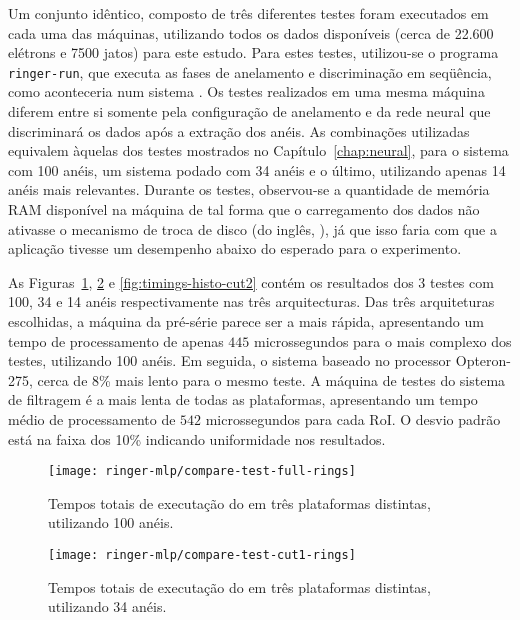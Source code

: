 Um conjunto idêntico, composto de três diferentes testes foram executados em
cada uma das máquinas, utilizando todos os dados disponíveis (cerca de 22.600
elétrons e 7500 jatos) para este estudo. Para estes testes, utilizou-se o
programa \texttt{ringer-run}, que executa as fases de anelamento e
discriminação em seqüência, como aconteceria num sistema .  Os
testes realizados em uma mesma máquina diferem entre si somente pela
configuração de anelamento e da rede neural que discriminará os dados após a
extração dos anéis. As combinações utilizadas equivalem àquelas dos testes
mostrados no Capítulo~\ref{chap:neural}, para o sistema com 100 anéis, um
sistema podado com 34 anéis e o último, utilizando apenas 14 anéis mais
relevantes. Durante os testes, observou-se a quantidade de memória RAM
disponível na máquina de tal forma que o carregamento dos dados não ativasse o
mecanismo de troca de disco (do inglês, ), já que isso faria com que
a aplicação tivesse um desempenho abaixo do esperado para o experimento.

As Figuras~\ref{fig:timings-histo-full}, \ref{fig:timings-histo-cut1} e
\ref{fig:timings-histo-cut2} contém os resultados dos 3 testes com 100, 34 e
14 anéis respectivamente nas três arquitecturas. Das três arquiteturas
escolhidas, a máquina da pré-série parece ser a mais rápida, apresentando um
tempo de processamento de apenas $445$ microssegundos para o mais complexo dos
testes, utilizando 100 anéis. Em seguida, o sistema baseado no processor
Opteron-275, cerca de 8\% mais lento para o mesmo teste. A máquina de testes
do sistema de filtragem é a mais lenta de todas as plataformas, apresentando
um tempo médio de processamento de $542$ microssegundos para cada RoI. O
desvio padrão está na faixa dos 10\% indicando uniformidade nos resultados.

\begin{figure}
\begin{center}
\texttt{[image: ringer-mlp/compare-test-full-rings]}
\end{center}
\caption{Tempos totais de executação do  em três plataformas
distintas, utilizando 100 anéis.}
\label{fig:timings-histo-full}
\end{figure}

\begin{figure}
\begin{center}
\texttt{[image: ringer-mlp/compare-test-cut1-rings]}
\end{center}
\caption{Tempos totais de executação do  em três plataformas
distintas, utilizando 34 anéis.}
\label{fig:timings-histo-cut1}
\end{figure}

